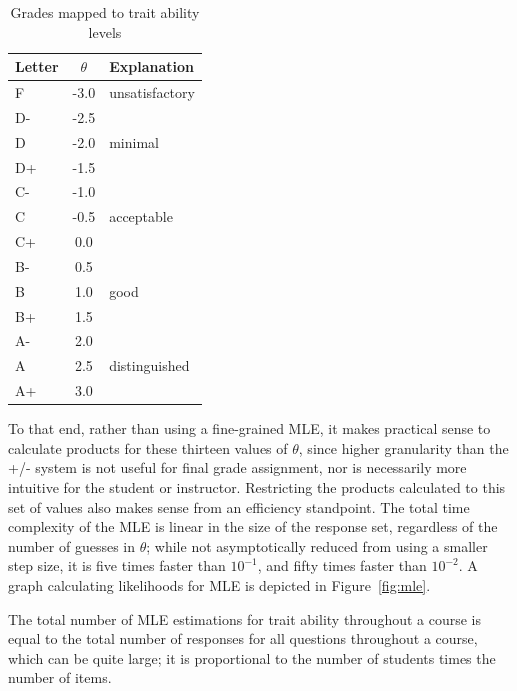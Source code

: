 \begin{table}[t]
\label{tab:grades}
\caption{Grades mapped to trait ability levels}
\vspace{12pt}
\begin{tabularx}{\textwidth}{||l|c|X||}
\hline\hline
\rowcolor{Gray}
Letter  & $\theta$  & Explanation \\\hline
F  & -3.0   & unsatisfactory \\\hline
D- & -2.5   &                \\
D  & -2.0   & minimal        \\
D+ & -1.5   &                \\\hline
C- & -1.0   &                \\
C  & -0.5   & acceptable     \\
C+ & 0.0    &                \\\hline
B- & 0.5    &                \\
B  & 1.0    & good           \\
B+ & 1.5    &                \\\hline
A- & 2.0    &                \\
A  & 2.5    & distinguished  \\
A+ & 3.0    &                \\\hline\hline
\end{tabularx}
\vspace{36pt}
\end{table}

To that end, rather than using a fine-grained MLE, it makes practical sense to
calculate products for these thirteen values of $\theta$, since higher
granularity than the +/- system is not useful for final grade assignment, nor
is necessarily more intuitive for the student or instructor.  Restricting the
products calculated to this set of values also makes sense from an efficiency
standpoint.  The total time complexity of the MLE is linear in the size of the
response set, regardless of the number of guesses in $\theta$; while not
asymptotically reduced from using a smaller step size, it is five times faster
than $10^{-1}$, and fifty times faster than $10^{-2}$.  A graph calculating
likelihoods for MLE is depicted in Figure~\ref{fig:mle}.


The total number of MLE estimations for trait ability throughout a course is
equal to the total number of responses for all questions throughout a course,
which can be quite large; it is proportional to the number of students times
the number of items. 

